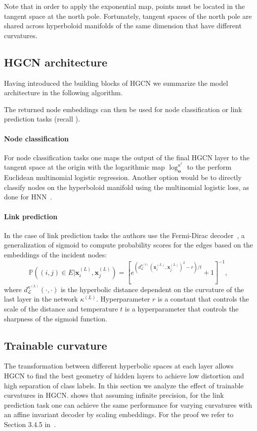 Note that in order to apply the exponential map, points must be located in the tangent space at the north pole. Fortunately, tangent spaces of the north pole are shared across hyperboloid manifolds of the same dimension that have different curvatures.

\subsection{HGCN architecture}
Having introduced the building blocks of HGCN we summarize the model architecture in the following algorithm.


The returned node embeddings can then be used for node classification or link prediction tasks (recall ).

\paragraph{Node classification}
For node classification tasks one maps the output of the final HGCN layer to the tangent space at the origin with the logarithmic map $\log_\mathbf{o}^{\kappa^\ell}$ to the perform Euclidean multinomial logistic regression. Another option would be to directly classify nodes on the hyperboloid manifold using the multinomial logistic loss, as done for HNN~\cite{ganea2018HNN}.

\paragraph{Link prediction}
In the case of link prediction tasks the authors use the Fermi-Dirac decoder~\cite{Krioukov2010HyperbolicGeometryComplexNetworks}\cite{nickel2017poincare}, a generalization of sigmoid to compute probability scores for the edges based on the embeddings of the incident nodes:
\begin{equation*}
    \mathbb{P}\left((i, j) \in E|\mathbf{x}_i^{(L)}, \mathbf{x}_j^{(L)}\right) = \left[e^{(d^{\kappa^{(L)}}_{\mathcal{L}}(\mathbf{x}^{(L)}_i, \mathbf{x}^{(L)}_j)^2-r)/t} + 1\right]^{-1},
\end{equation*}
where $d^{\kappa^{(L)}}_{\mathcal{L}}(\cdot, \cdot)$ is the hyperbolic distance dependent on the curvature of the last layer in the network $\kappa^{(L)}$. Hyperparameter $r$ is a constant that controls the scale of the distance and temperature $t$ is a hyperparameter that controls the sharpness of the sigmoid function.

\subsection{Trainable curvature}
The transformation between different hyperbolic spaces at each layer allows HGCN to find the best geometry of hidden layers to achieve low distortion and high separation of class labels. In this section we analyze the effect of trainable curvatures in HGCN.  shows that assuming infinite precision, for the link prediction task one can achieve the same performance for varying curvatures with an affine invariant decoder by scaling embeddings. For the proof we refer to Section 3.4.5 in~\cite{Chami2021representationLearningAlgorithmsHyperbolicSpaces}.

